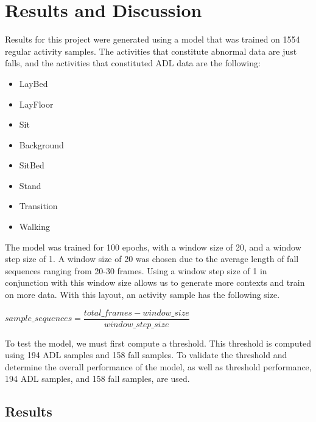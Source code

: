\chapter{Results and Discussion}\label{ch:eval}
Results for this project were generated using a model that was trained on 1554 regular activity samples. The activities that constitute abnormal data are just falls, and the activities that constituted ADL data are the following:
\begin{itemize}
    \item LayBed
    \item LayFloor
    \item Sit
    \item Background
    \item SitBed
    \item Stand
    \item Transition
    \item Walking
\end{itemize}
The model was trained for 100 epochs, with a window size of 20, and a window step size of 1. A window size of 20 was chosen due to the average length of fall sequences ranging from 20-30 frames. Using a window step size of 1 in conjunction with this window size allows us to generate more contexts and train on more data. With this layout, an activity sample has the following size. 

\begin{center}
$sample\_sequences = \dfrac{total\_frames - window\_size}{window\_step\_size}$    
\end{center}

To test the model, we must first compute a threshold. This threshold is computed using 194 ADL samples and 158 fall samples. To validate the threshold and determine the overall performance of the model, as well as threshold performance, 194 ADL samples, and 158 fall samples, are used.

\section{Results}
